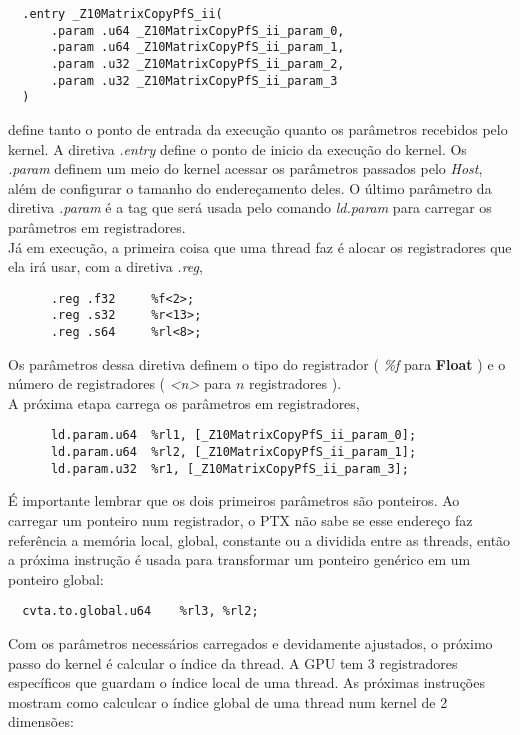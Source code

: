 \begin{lstlisting}
  .entry _Z10MatrixCopyPfS_ii(
	  .param .u64 _Z10MatrixCopyPfS_ii_param_0,
	  .param .u64 _Z10MatrixCopyPfS_ii_param_1,
	  .param .u32 _Z10MatrixCopyPfS_ii_param_2,
	  .param .u32 _Z10MatrixCopyPfS_ii_param_3
  )
\end{lstlisting}

define tanto o ponto de entrada da execução quanto os parâmetros recebidos pelo kernel. A diretiva \textit{.entry} define o ponto de inicio da execução do kernel.
Os \textit{.param} definem um meio do kernel acessar os parâmetros passados pelo \textit{Host}, além de configurar o tamanho do endereçamento deles. 
O último parâmetro da diretiva \textit{.param} é a tag que será usada pelo comando \textit{ld.param} para carregar os parâmetros em registradores. \\

Já em execução, a primeira coisa que uma thread faz é alocar os registradores que ela irá usar, com a diretiva \textit{.reg},

\begin{lstlisting}
	  .reg .f32 	%f<2>;
	  .reg .s32 	%r<13>;
	  .reg .s64 	%rl<8>;
\end{lstlisting}

Os parâmetros dessa diretiva definem o tipo do registrador ( \textit{\%f} para \textbf{Float} ) e o número de registradores ( \textit{<n>} para $n$ registradores ). \\

A próxima etapa carrega os parâmetros em registradores,

\begin{lstlisting}
	  ld.param.u64 	%rl1, [_Z10MatrixCopyPfS_ii_param_0];
	  ld.param.u64 	%rl2, [_Z10MatrixCopyPfS_ii_param_1];
	  ld.param.u32 	%r1, [_Z10MatrixCopyPfS_ii_param_3];
\end{lstlisting}

É importante lembrar que os dois primeiros parâmetros são ponteiros. Ao carregar um ponteiro num registrador, o PTX não sabe se esse endereço faz
referência a memória local, global, constante ou a dividida entre as threads, então a próxima instrução é usada para transformar um ponteiro genérico
em um ponteiro global:

\begin{lstlisting}
  cvta.to.global.u64 	%rl3, %rl2;
\end{lstlisting}

Com os parâmetros necessários carregados e devidamente ajustados, o próximo passo do kernel é calcular o índice da thread. A GPU tem 3 registradores
específicos que guardam o índice local de uma thread. As próximas instruções mostram como calculcar o índice global de uma thread num kernel de 
2 dimensões:

